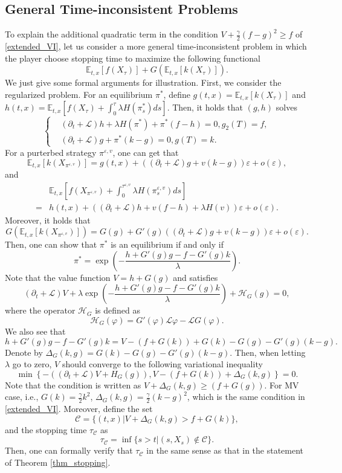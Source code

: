 \documentclass[11pt]{article}
\begin{document}
\subsection{General Time-inconsistent Problems}
To explain the additional quadratic term in the condition $V+\frac\gamma2(f-g)^2\ge f$ of \eqref{extended_VI},  let us consider a more general time-inconsistent problem in which the player choose stopping time to maximize the following functional
$$
\mathbb E_{t,x}[f(X_\tau)]+G(\mathbb E_{t,x}[k(X_\tau)]). 
$$
We just give some formal arguments for illustration. First, we consider the regularized problem. For an equilibrium $\pi^*$, define $g(t,x)=\mathbb E_{t,x}[k(X_\tau)]$ and $h(t,x)=\mathbb E_{t,x}[f(X_\tau)+\int_0^\tau \lambda H(\pi^*_s)ds]$. Then, it holds that $(g,h)$ solves
\begin{equation*}
\left\{
\begin{split}
&(\partial_t+\mathcal L)h+\lambda H(\pi^*)+\pi^*(f- h)=0,g_2(T)=f,\\
&(\partial_t+\mathcal L)g+\pi^*(k-g)=0,g(T)=k.
\end{split}
\right. 
\end{equation*}
For a purterbed strategy $\pi^{\varepsilon,v}$, one can get that 
$$
\mathbb E_{t,x}[k(X_{\pi^{\varepsilon,v}})]=g(t,x)+\left((\partial_t+\mathcal L)g+v(k-g)\right)\varepsilon+o(\varepsilon),
$$
and
\begin{equation*}
	\begin{split}
		&\mathbb E_{t,x}[f(X_{\pi^{\varepsilon,v}})+\int_0^{\tau^{\varepsilon,v}} \lambda H(\pi^{\varepsilon,v}_s)ds]\\
		=&h(t,x)+\left((\partial_t+\mathcal L)h+v(f-h)+\lambda H(v)\right)\varepsilon+o(\varepsilon).
	\end{split}
\end{equation*}
Moreover, it holds that 
$$
G(\mathbb E_{t,x}[k(X_{\pi^{\varepsilon,v}})])=G(g)+G'(g)\left((\partial_t+\mathcal L)g+v(k-g)\right)\varepsilon+o(\varepsilon).
$$
Then, one can show that $\pi^*$ is an equilibrium if and only if
$$
\pi^*=\exp(-\frac{h+G'(g)g-f-G'(g)k}{\lambda}).
$$
Note that the value function $V=h+G(g)$ and satisfies 
$$
(\partial_t+\mathcal L)V+\lambda \exp(-\frac{h+G'(g)g-f-G'(g)k}{\lambda})+\mathcal H_G(g)=0,
$$
where the operator $\mathcal H_G$ is defined as 
$$
\mathcal H_G(\varphi)=G'(\varphi)\mathcal L\varphi-\mathcal  L G(\varphi). 
$$
We also see that 
$$
h+G'(g)g-f-G'(g)k=V-(f+G(k))+G(k)-G(g)-G'(g)(k-g).
$$
Denote by $\Delta_G(k,g)=G(k)-G(g)-G'(g)(k-g)$. Then, when letting $\lambda$ go to zero, $V$ should converge to the following variational inequality
$$
\min\left\{-\left((\partial_t+\mathcal L)V+H_G(g)\right), V-(f+G(k))+\Delta_G(k,g) \right\}=0.
$$
Note that the condition is written as  $V+\Delta_G(k,g)\ge (f+G(g))$.  For  MV case, i.e., $G(k)=\frac\gamma2 k^2$, $\Delta_G(k,g)=\frac\gamma2 (k-g)^2$, which is the same condition in \eqref{extended_VI}. Moreover, define the set 
$$
\mathcal C=\{(t,x)|V+\Delta_G(k,g)>f+G(k)\},
$$
and the stopping time $\tau_{\mathcal C}$ as 
$$
\tau_{\mathcal C}=\inf\{s>t|(s,X_s) \notin \mathcal C\}. 
$$
Then, one can  formally verify that $\tau_{\mathcal C}$ in the same sense as that in the statement of Theorem \ref{thm_stopping}.
\end{document}
